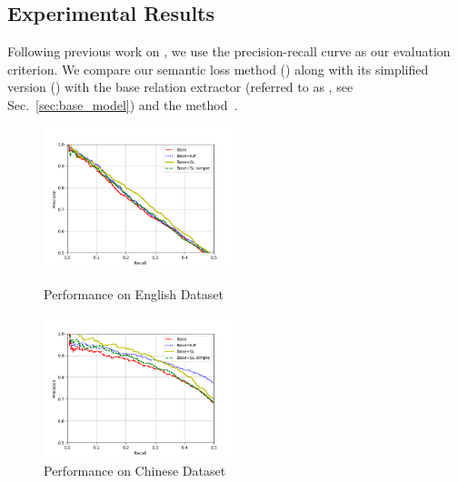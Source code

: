 \subsection{Experimental Results}
Following previous work on \RE, we use the precision-recall curve as our evaluation criterion.
We compare our semantic loss method (\SL) along with its simplified version (\SLsimple) with the base relation extractor (referred to as \base, see Sec.~\ref{sec:base_model}) and the \ILP method~\cite{chen2014encoding}.
\begin{figure}[h]
	\centering
	\begin{minipage}[t]{0.45\textwidth}
		\centering
		\includegraphics[width=5.5cm]{./result-figure/DBpedia-CNN-result.png}
		\caption{Performance on English Dataset}
		\label{fig:dbpedia}
	\end{minipage}
	\begin{minipage}[t]{0.45\textwidth}
		\centering
		\includegraphics[width=5.5cm]{./result-figure/Chinese-CNN-result.png}
		\caption{Performance on Chinese Dataset}
		\label{fig:chinese}
	\end{minipage}
\end{figure}


